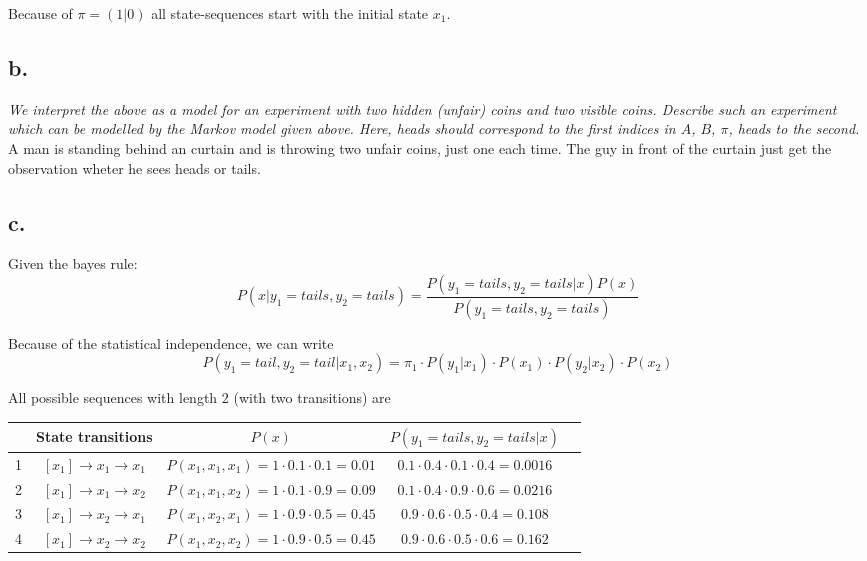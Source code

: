 \documentclass[a4paper, 12pt, titlepage]{article}
\begin{document}
Because of $\pi = (1 | 0)$ all state-sequences start with the initial state $x_1$.
  
\subsection{b.}


\textit{We interpret the above as a model for an experiment with two hidden (unfair) coins and two visible coins. Describe such an experiment which can be modelled by the Markov model given above. Here, heads should correspond to the first indices in $A$, $B$, $\pi$, heads to the second.} \newline \newline
A man is standing behind an curtain and is throwing two unfair coins, just one each time. The guy in front of the curtain just get the observation wheter he sees heads or tails. 

\newpage
\subsection{c.}

Given the bayes rule:
\begin{equation}
   P(x|y_1=tails,y_2=tails) =  \frac{P(y_1=tails,y_2=tails|x)P(x)}{P(y_1=tails,y_2=tails)}
\end{equation}

Because of the statistical independence, we can write
\begin{equation}
  P(y_1=tail,y_2=tail|x_1,x_2) = \pi_1 \cdot P(y_1|x_1) \cdot P(x_1) \cdot P(y_2|x_2) \cdot P(x_2)
\end{equation}

All possible sequences with length $2$ (with two transitions) are

\begin{tabular}{l*{3}{c}r}
              & State transitions & $P(x)$ & $P(y_1=tails,y_2=tails|x) $ \\
\hline
1 & $[x_1] \rightarrow x_1 \rightarrow x_1$ & $P(x_1,x_1,x_1)= 1\cdot0.1\cdot0.1=0.01 $ & $0.1\cdot0.4\cdot 0.1\cdot0.4=0.0016$\\
2 & $[x_1] \rightarrow x_1 \rightarrow x_2$ & $P(x_1,x_1,x_2)= 1\cdot0.1\cdot0.9=0.09 $ & $0.1\cdot 0.4 \cdot 0.9 \cdot 0.6=0.0216 $ \\
3 & $[x_1] \rightarrow x_2 \rightarrow x_1$ & $P(x_1,x_2,x_1)= 1\cdot0.9\cdot0.5=0.45 $ & $0.9 \cdot 0.6 \cdot 0.5 \cdot 0.4 = 0.108 $\\
4 & $[x_1] \rightarrow x_2 \rightarrow x_2$ & $P(x_1,x_2,x_2)= 1\cdot0.9\cdot0.5=0.45 $ & $0.9 \cdot 0.6 \cdot 0.5 \cdot 0.6 = 0.162$
 \end{tabular}
\end{document}
